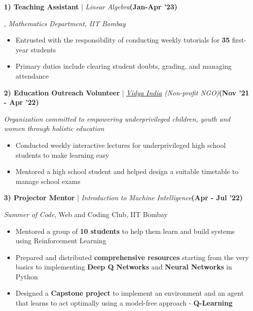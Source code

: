 \documentclass[10pt,letterpaper,sans]{moderncv}        %
\newcommand\x{1}
\newcommand\y{4}
\begin{document}
\textbf{1) Teaching Assistant} | \emph{Linear Algebra}\hfill{\textbf{(Jan-Apr '23)}}

{\textit{, Mathematics Department, IIT Bombay}}

\vspace{\x pt}
\begin{itemize}
    \item Entrusted with the responsibility of conducting weekly tutorials for \textbf{35} first-year students
    \item Primary duties include clearing student doubts, grading, and managing attendance 
\end{itemize}

\hrulefill{}
\vspace{\y pt}

\textbf{2) Education Outreach Volunteer} | \emph{\href{https://vidya-india.org/about-us/programs/mumbai/}{Vidya India} (Non-profit NGO)}\hfill{\textbf{(Nov '21 - Apr '22)}}

\textcolor{mygray}{\textit{Organization committed to empowering underprivileged children, youth and women through holistic education}}

\vspace{\x pt}
\begin{itemize}
    \item Conducted weekly interactive lectures for underprivileged high school students to make learning easy
    \item Mentored a high school student and helped design a suitable timetable to manage school exams
\end{itemize}

\hrulefill{}
\vspace{\y pt}

\textbf{3) Projector Mentor} | \emph{Introduction to Machine Intelligence}\hfill{\textbf{(Apr - Jul '22)}}

\textit{Summer of Code},  Web and Coding Club, IIT Bombay

\vspace{\x pt}
\begin{itemize}
    \item Mentored a group of \textbf{10 students} to help them learn and build systems using Reinforcement Learning
    \item Prepared and distributed \textbf{comprehensive resources} starting from the very basics to implementing \textbf{Deep Q Networks} and \textbf{Neural Networks} in Python
    \item Designed a \textbf{Capstone project} to implement an environment and an agent that learns to act optimally using a model-free approach - \textbf{Q-Learning}
\end{itemize}
\end{document}
